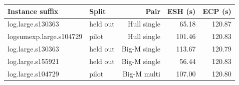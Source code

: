 \begin{tabular}{llrrr}
\toprule
Instance suffix & Split & Pair & ESH (s) & ECP (s) \\
\midrule
log.large.s130363 & held out & Hull single & 65.18 & 120.87 \\
logsumexp.large.s104729 & pilot & Hull single & 101.46 & 120.83 \\
log.large.s130363 & held out & Big-M single & 113.67 & 120.79 \\
log.large.s155921 & held out & Big-M single & 56.44 & 120.83 \\
log.large.s104729 & pilot & Big-M multi & 107.00 & 120.80 \\
\bottomrule
\end{tabular}
